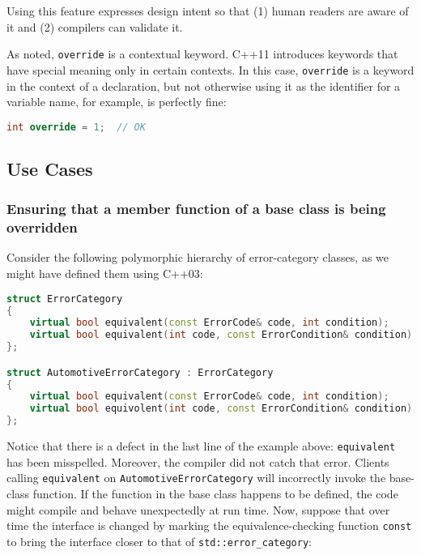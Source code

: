 \noindent Using this feature expresses design intent so that (1) human readers
are aware of it and (2) compilers can validate it.

As noted, \lstinline!override! is a contextual keyword. C++11 introduces keywords that have special meaning only in certain contexts.   In this case, \lstinline!override! is a keyword in the context of a declaration, but not otherwise using it as the identifier for a variable name, for example, is perfectly fine:

\begin{lstlisting}[language=C++]
int override = 1;  // OK
\end{lstlisting}

\subsection[Use Cases]{Use Cases}\label{use-cases}

\subsubsection[Ensuring that a member function of a base class is being overridden]{Ensuring that a member function of a base class is being overridden}\label{ensuring-that-a-member-function-of-a-base-class-is-being-overridden}

Consider the following polymorphic hierarchy of error-category classes, as we might have defined them using C++03:

\begin{lstlisting}[language=C++]
struct ErrorCategory
{
    virtual bool equivalent(const ErrorCode& code, int condition);
    virtual bool equivalent(int code, const ErrorCondition& condition);
};

struct AutomotiveErrorCategory : ErrorCategory
{
    virtual bool equivalent(const ErrorCode& code, int condition);
    virtual bool equivolent(int code, const ErrorCondition& condition);
};
\end{lstlisting}

\noindent Notice that there is a defect in the last line of the example above:
\lstinline!equivalent! has been misspelled. Moreover, the compiler did not
catch that error. Clients calling \lstinline!equivalent! on
\lstinline!AutomotiveErrorCategory! will incorrectly invoke the base-class
function. If the function in the base class happens to be defined, the
code might compile and behave unexpectedly at run time. Now, suppose
that over time the interface is changed by marking the
equivalence-checking function \lstinline!const! to bring the interface
closer to that of \lstinline!std::error_category!:

